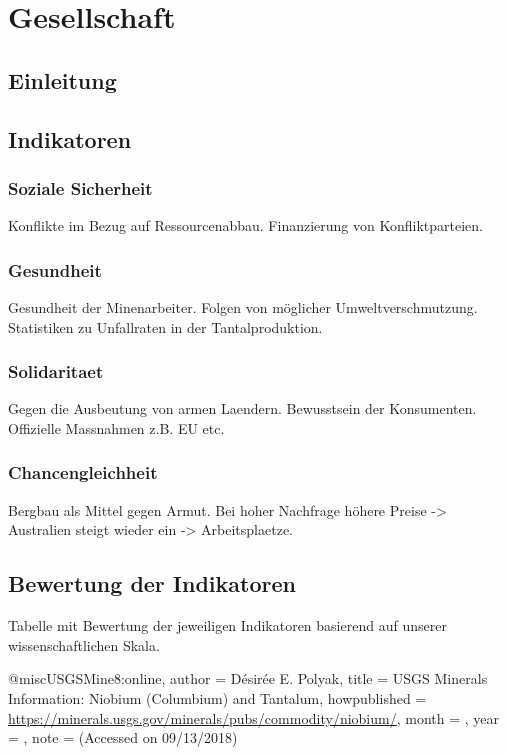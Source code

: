 \section{Gesellschaft}\label{sec:society}

\subsection{Einleitung}

\subsection{Indikatoren}

\subsubsection{Soziale Sicherheit}

Konflikte im Bezug auf Ressourcenabbau.
Finanzierung von Konfliktparteien.

\subsubsection{Gesundheit}

Gesundheit der Minenarbeiter.
Folgen von möglicher Umweltverschmutzung.
Statistiken zu Unfallraten in der Tantalproduktion.

\subsubsection{Solidaritaet}

Gegen die Ausbeutung von armen Laendern.
Bewusstsein der Konsumenten.
Offizielle Massnahmen  z.B. EU etc.

\subsubsection{Chancengleichheit}

Bergbau als Mittel gegen Armut.
Bei hoher Nachfrage höhere Preise -> Australien steigt wieder ein -> Arbeitsplaetze.

\subsection{Bewertung der Indikatoren}

Tabelle mit Bewertung der jeweiligen Indikatoren basierend auf unserer wissenschaftlichen Skala.


@misc{USGSMine8:online,
author = {Désirée E. Polyak},
title = {USGS Minerals Information: Niobium (Columbium) and Tantalum},
howpublished = {\url{https://minerals.usgs.gov/minerals/pubs/commodity/niobium/}},
month = {},
year = {},
note = {(Accessed on 09/13/2018)}
}

